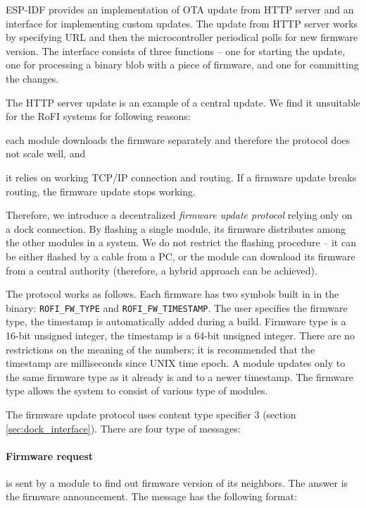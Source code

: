 ESP-IDF provides an implementation of OTA update from HTTP server and an
interface for implementing custom updates. The update from HTTP server works by
specifying URL and then the microcontroller periodical polls for new firmware
version. The interface consists of three functions -- one for starting the
update, one for processing a binary blob with a piece of firmware, and one for
committing the changes.

The HTTP server update is an example of a central update. We find it unsuitable
for the RoFI systems for following reasons:
\begin{enumerate*}
    \item each module downloads the firmware separately and therefore the
    protocol does not scale well, and
    \item it relies on working TCP/IP connection and routing. If a firmware
    update breaks routing, the firmware update stops working.
\end{enumerate*}
Therefore, we introduce a decentralized \emph{firmware update protocol} relying
only on a dock connection. By flashing a single module, its firmware distributes
among the other modules in a system. We do not restrict the flashing procedure
-- it can be either flashed by a cable from a PC, or the module can download its
firmware from a central authority (therefore, a hybrid approach can be
achieved).

The protocol works as follows. Each firmware has two symbols built in in the
binary: \texttt{ROFI\_FW\_TYPE} and \texttt{ROFI\_FW\_TIMESTAMP}. The user
specifies the firmware type, the timestamp is automatically added during a
build. Firmware type is a 16-bit unsigned integer, the timestamp is a 64-bit
unsigned integer. There are no restrictions on the meaning of the numbers; it is
recommended that the timestamp are milliseconds since UNIX time epoch. A module
updates only to the same firmware type as it already is and to a newer
timestamp. The firmware type allows the system to consist of various type of
modules.

The firmware update protocol uses content type specifier 3 (section
\ref{sec:dock_interface}). There are four type of messages:

\paragraph{Firmware request} is sent by a module to find out firmware version of
its neighbors. The answer is the firmware announcement. The message has the
following format:

